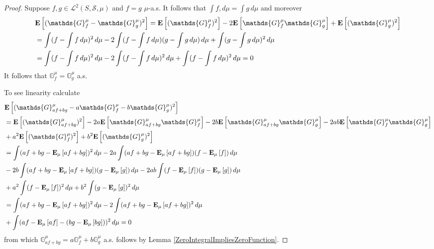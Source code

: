 \begin{proof}
Suppose $f,g \in \mathcal{L}^2(S, \mathcal{S}, \mu)$ and $f = g$ $\mu$-a.s. It follows that $\int f , d\mu = \int g \, d\mu$ and moreover 
\begin{align*}
&\expectation{(\mathds{G}^\mu_f - \mathds{G}^\mu_g)^2} = \expectation{(\mathds{G}^\mu_f)^2} - 2\expectation{\mathds{G}^\mu_f \mathds{G}^\mu_g} + \expectation{(\mathds{G}^\mu_g)^2} \\
&=\int (f - \int f \, d\mu)^2 \, d\mu - 2 \int (f - \int f \, d\mu)(g - \int g \, d\mu) \, d\mu + \int (g - \int g \, d\mu)^2\, d\mu \\
&=\int (f - \int f \, d\mu)^2 \, d\mu - 2 \int (f - \int f \, d\mu)^2 \, d\mu + \int (f - \int f\, d\mu)^2\, d\mu = 0
\end{align*}
It follows that $\mathds{G}^\mu_f = \mathds{G}^\mu_g$ a.s.

To see linearity calculate
\begin{align*}
&\expectation{(\mathds{G}^\mu_{a f + b g} - a \mathds{G}^\mu_f - b \mathds{G}^\mu_g)^2} \\
&=\expectation{(\mathds{G}^\mu_{a f + b g})^2} -2 a\expectation{\mathds{G}^\mu_{a f + b g}\mathds{G}^\mu_{f}} -2 b\expectation{\mathds{G}^\mu_{a f + b g}\mathds{G}^\mu_g} - 2 ab\expectation{\mathds{G}^\mu_{f}\mathds{G}^\mu_g} \\
&+a^2\expectation{(\mathds{G}^\mu_{f})^2}  + b^2\expectation{(\mathds{G}^\mu_{g})^2}  \\
&=\int (a f + b g - \sexpectation{a f + b g}{\mu})^2 \, d\mu -2a \int (a f + b g - \sexpectation{a f + b g}{\mu}) (f - \sexpectation{f}{\mu}) \, d\mu \\
&-2 b\int (a f + b g - \sexpectation{a f + b g}{\mu}) (g - \sexpectation{g}{\mu}) \, d\mu -2 ab\int (f - \sexpectation{ f}{\mu}) (g - \sexpectation{g}{\mu}) \, d\mu \\
&+a^2 \int (f  - \sexpectation{f}{\mu})^2 \, d\mu + b^2 \int (g - \sexpectation{g}{\mu})^2 \, d\mu \\
&=\int (a f + b g - \sexpectation{a f + b g}{\mu})^2 \, d\mu -2 \int (a f + b g - \sexpectation{a f + b g}{\mu})^2 \, d\mu \\
&+\int (a f  - \sexpectation{a f}{\mu} - (b g - \sexpectation{b g}{\mu}))^2 \, d\mu = 0
\end{align*}
from which $\mathds{G}^\mu_{af+bg} = a\mathds{G}^\mu_f + b \mathds{G}^\mu_g$ a.s. follows by Lemma \ref{ZeroIntegralImpliesZeroFunction}.
 

\end{proof}
